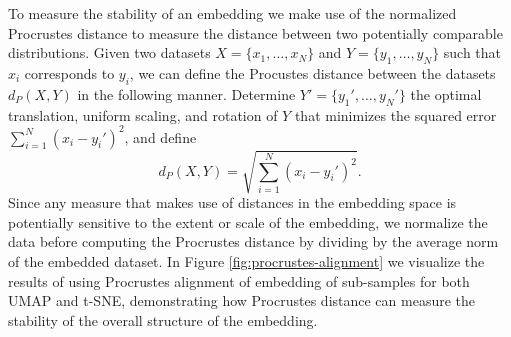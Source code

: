 \documentclass[12pt]{article}
\begin{document}
To measure the stability of an embedding we make use of the normalized Procrustes distance to measure the distance between two potentially comparable distributions. Given two datasets $X = \{x_1, \ldots, x_N\}$ and $Y = \{y_1, \ldots, y_N\}$ such that $x_i$ corresponds to $y_i$, we can define the Procustes distance between the datasets $d_P(X, Y)$ in the following manner. Determine $Y' = \{{y_1}',\ldots, {y_N}'\}$ the optimal translation, uniform scaling, and rotation of $Y$ that minimizes the squared error $\sum_{i=1}^N (x_i - {y_i}')^2$, and define 
\[
d_P(X, Y) = \sqrt{\sum_{i=1}^N (x_i - {y_i}')^2}.
\]
Since any measure that makes use of distances in the embedding space is potentially sensitive to the extent or scale of the embedding, we normalize the data before computing the Procrustes distance by dividing by the average norm of the embedded dataset. In Figure \ref{fig:procrustes-alignment} we visualize the results of using Procrustes alignment of embedding of sub-samples for both UMAP and t-SNE, demonstrating how Procrustes distance can measure the stability of the overall structure of the embedding. 
\end{document}
